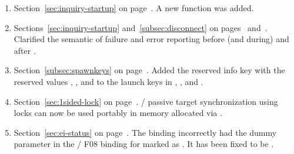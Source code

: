 \begin{enumerate}
{}
\item
Section~\ref{sec:inquiry-startup} on page~\pageref{sec:inquiry-startup}.
\newline
A new function  was added.

\item
    Sections~\ref{sec:inquiry-startup} and~\ref{subsec:disconnect}
    on pages~\pageref{sec:inquiry-startup} and~\pageref{subsec:disconnect}.
    \newline
    Clarified the semantic of failure and error reporting before (and during)  and after .

\item
    Section~\ref{subsec:spawnkeys} on page~\pageref{subsec:spawnkeys}.
    \newline
    Added the  reserved info key with the
    reserved values ,
    , and  to the
    launch keys in , , and .

\item
  Section~\ref{sec:1sided-lock} on page~\pageref{sec:1sided-lock}.
  \newline
  \RMA/ passive target synchronization using locks can now be used portably in memory
  allocated via .

\item
  Section~\ref{sec:ei-status} on page~\pageref{sec:ei-status}.
  \newline
  The  binding incorrectly had the dummy parameter
   in the \MPI/ F08 binding for
   marked as
  .  It has been fixed to be .


\end{enumerate}

